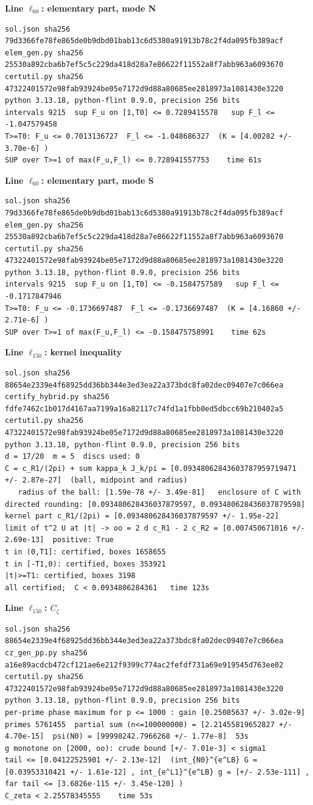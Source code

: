\documentclass[11pt,reqno]{amsart}
\numberwithin{equation}{section}
\theoremstyle{definition}
\theoremstyle{remark}
\newcommand{\appsub}[1]{\par\medskip\noindent\textbf{#1}\par\nobreak\smallskip}
\begin{document}
\appsub{Line $\ell_{60}$: elementary part, mode N}
\begin{lstlisting}
sol.json sha256 79d3366fe78fe865de0b9dbd01bab13c6d5380a91913b78c2f4da095fb389acf
elem_gen.py sha256 25530a892cba6b7ef5c5c229da418d28a7e86622f11552a8f7abb963a6093670
certutil.py sha256 47322401572e98fab93924be05e7172d9d88a80685ee2818973a1081430e3220
python 3.13.18, python-flint 0.9.0, precision 256 bits
intervals 9215  sup F_u on [1,T0] <= 0.7289415578   sup F_l <= -1.047579458
T>=T0: F_u <= 0.7013136727  F_l <= -1.048686327  (K = [4.00282 +/- 3.70e-6] )
SUP over T>=1 of max(F_u,F_l) <= 0.728941557753    time 61s
\end{lstlisting}
\appsub{Line $\ell_{60}$: elementary part, mode S}
\begin{lstlisting}
sol.json sha256 79d3366fe78fe865de0b9dbd01bab13c6d5380a91913b78c2f4da095fb389acf
elem_gen.py sha256 25530a892cba6b7ef5c5c229da418d28a7e86622f11552a8f7abb963a6093670
certutil.py sha256 47322401572e98fab93924be05e7172d9d88a80685ee2818973a1081430e3220
python 3.13.18, python-flint 0.9.0, precision 256 bits
intervals 9215  sup F_u on [1,T0] <= -0.1584757589   sup F_l <= -0.1717847946
T>=T0: F_u <= -0.1736697487  F_l <= -0.1736697487  (K = [4.16860 +/- 2.71e-6] )
SUP over T>=1 of max(F_u,F_l) <= -0.158475758991    time 62s
\end{lstlisting}
\appsub{Line $\ell_{150}$: kernel inequality}
\begin{lstlisting}
sol.json sha256 88654e2339e4f68925dd36bb344e3ed3ea22a373bdc8fa02dec09407e7c066ea
certify_hybrid.py sha256 fdfe7462c1b017d4167aa7199a16a82117c74fd1a1fbb0ed5dbcc69b210402a5
certutil.py sha256 47322401572e98fab93924be05e7172d9d88a80685ee2818973a1081430e3220
python 3.13.18, python-flint 0.9.0, precision 256 bits
d = 17/20  m = 5  discs used: 0 
C = c_R1/(2pi) + sum kappa_k J_k/pi = [0.09348062843603787959719471 +/- 2.87e-27]  (ball, midpoint and radius)
   radius of the ball: [1.59e-78 +/- 3.49e-81]   enclosure of C with directed rounding: [0.093480628436037879597, 0.093480628436037879598]
kernel part c_R1/(2pi) = [0.093480628436037879597 +/- 1.95e-22]
limit of t^2 U at |t| -> oo = 2 d c_R1 - 2 c_R2 = [0.007450671016 +/- 2.69e-13]  positive: True
t in (0,T1]: certified, boxes 1658655
t in [-T1,0): certified, boxes 353921
|t|>=T1: certified, boxes 3198
all certified;  C < 0.0934806284361   time 123s
\end{lstlisting}
\appsub{Line $\ell_{150}$: $C_\zeta$}
\begin{lstlisting}
sol.json sha256 88654e2339e4f68925dd36bb344e3ed3ea22a373bdc8fa02dec09407e7c066ea
cz_gen_pp.py sha256 a16e89acdcb472cf121ae6e212f9399c774ac2fefdf731a69e919545d763ee02
certutil.py sha256 47322401572e98fab93924be05e7172d9d88a80685ee2818973a1081430e3220
python 3.13.18, python-flint 0.9.0, precision 256 bits
per-prime phase maximum for p <= 1000 : gain [0.25085637 +/- 3.02e-9]
primes 5761455  partial sum (n<=100000000) = [2.21455819652827 +/- 4.70e-15]  psi(N0) = [99998242.7966268 +/- 1.77e-8]  53s
g monotone on [2000, oo): crude bound [+/- 7.01e-3] < sigma1
tail <= [0.04122525901 +/- 2.13e-12]  (int_{N0}^{e^LB} G = [0.03953310421 +/- 1.61e-12] , int_{e^L1}^{e^LB} g = [+/- 2.53e-111] , far tail <= [3.6826e-115 +/- 3.45e-120] )
C_zeta < 2.25578345555    time 53s
\end{lstlisting}
\end{document}
